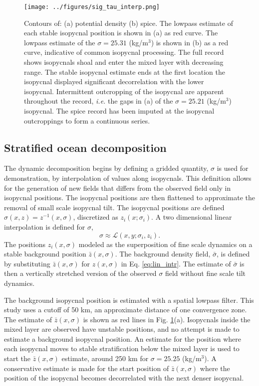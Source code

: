 \documentclass[preprint,NumberedRefs]{JASA}
\begin{document}
\begin{figure}
\texttt{[image: ../figures/sig\_tau\_interp.png]}
    \caption{\label{fig:cntrs}{Contours of: (a) potential density (b) spice. The lowpass estimate of each stable isopycnal position is shown in (a) as red curve. The lowpass estimate of the $\sigma=25.31$ (kg/m$^3$) is shown in (b) as a red curve, indicative of common isopycnal processing. The full record shows isopycnals shoal and enter the mixed layer with decreasing range. The stable isopycnal estimate ends at the first location the isopycnal displayed significant decorrelation with the lower isopycnal. Intermittent outcropping of the isopycnal are apparent throughout the record, \emph{i.e.} the gaps in (a) of the $\sigma=25.21$ (kg/m$^3$) isopycnal. The spice record has been imputed at the isopycnal outcroppings to form a continuous series.}}
\end{figure}

\subsection{Stratified ocean decomposition}
The dynamic decomposition begins by defining a gridded quantity, $\sigma$ is used for demonstration, by interpolation of values along isopycnals. This definition allows for the generation of new fields that differs from the observed field only in isopycnal positions. The isopycnal positions are then flattened to approximate the removal of small scale isopycnal tilt. The isopycnal positions are defined $\sigma(x, z) = z^{-1}(x, \sigma)$, discretized as $z_i(x; \sigma_i)$. A two dimensional linear interpolation is defined for $\sigma$,
\begin{equation}
    \sigma\approx\mathcal{L}(x, y; \sigma_i, z_i).
    \label{eq:lin_intr}
\end{equation}
The positions $z_i(x, \sigma)$ modeled as the superposition of fine scale dynamics on a stable background position $\bar{z}(x, \sigma)$. The background density field, $\bar{\sigma}$, is defined by substituting $\bar{z}(x, \sigma)$ for $z(x, \sigma)$ in Eq. \eqref{eq:lin_intr}. The estimate of $\bar{\sigma}$ is then a vertically stretched version of the observed $\sigma$ field without fine scale tilt dynamics.

The background isopycnal position is estimated with a spatial lowpass filter. This study uses a cutoff of 50 km, an approximate distance of one convergence zone. The estimate of $\bar{z}(x, \sigma)$ is shown as red lines in Fig. \ref{fig:cntrs}(a). Isopycnals inside the mixed layer are observed have unstable positions, and no attempt is made to estimate a background isopycnal position. An estimate for the position where each isopycnal moves to stable stratification below the mixed layer is used to start the $\bar{z}(x, \sigma)$ estimate, around 250 km for $\sigma=25.25$ (kg/m$^3$). A conservative estimate is made for the start position of $\bar{z}(x, \sigma)$ where the position of the isopycnal becomes decorrelated with the next denser isopycnal.
\end{document}
